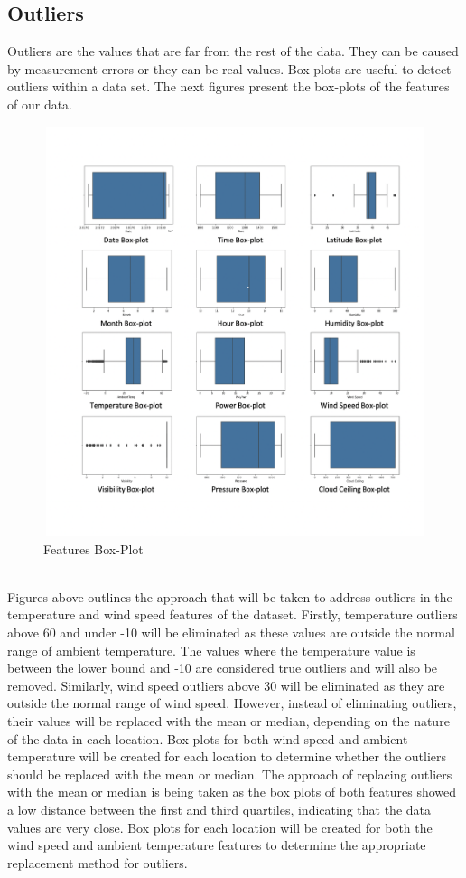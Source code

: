 \documentclass{report}
\begin{document}
\subsection{Outliers}
Outliers are the values that are far from the rest of the data. They can be caused by measurement errors or they can be real values. Box plots are useful to detect outliers within a data set. The next figures present the box-plots of the features of our data.
\begin{figure}[h!]
    \centering
    \includegraphics[width=12cm, height=12cm]{1111.png}
    \caption{Features Box-Plot}
\end{figure}\newpage \hfill \break 
\\
Figures above outlines the approach that will be taken to address outliers in the temperature and wind speed features of the dataset. Firstly, temperature outliers above 60 and under -10 will be eliminated as these values are outside the normal range of ambient temperature. The values where the temperature value is between the lower bound and -10 are considered true outliers and will also be removed. Similarly, wind speed outliers above 30 will be eliminated as they are outside the normal range of wind speed. However, instead of eliminating outliers, their values will be replaced with the mean or median, depending on the nature of the data in each location. Box plots for both wind speed and ambient temperature will be created for each location to determine whether the outliers should be replaced with the mean or median. The approach of replacing outliers with the mean or median is being taken as the box plots of both features showed a low distance between the first and third quartiles, indicating that the data values are very close. Box plots for each location will be created for both the wind speed and ambient temperature features to determine the appropriate replacement method for outliers.
\end{document}
